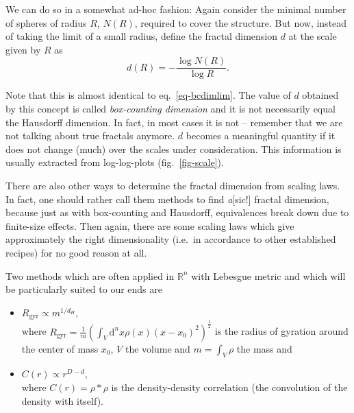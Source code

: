 \documentclass[twocolumn,10pt]{scrartcl}
\begin{document}
            We can do so in a somewhat ad-hoc fashion: Again consider the minimal number of spheres of radius $R$,
            $N(R)$, required to cover the structure. But now, instead of taking the limit of a small radius, define the
            fractal dimension $d$ at the scale given by $R$ as
            \begin{equation}
                d(R)=-\frac{\log N(R)}{\log R}.
                \label{eq-bcdim}
            \end{equation}

            Note that this is almost identical to eq.~\ref{eq-bcdimlim}. 
            The value of $d$ obtained by this concept is called \emph{box-counting dimension} and it is not
            necessarily equal the Hausdorff dimension. In fact, in most cases it is not -- remember that we are not
            talking about true fractals anymore. $d$ becomes a meaningful quantity if it does
            not change (much) over the scales under consideration. This information is usually extracted from
            log-log-plots (fig.~\ref{fig-scale}).

            There are also other ways to determine the fractal dimension from scaling laws. In fact, one should rather
            call them methods to find \emph{a}[sic!] fractal dimension, because just as with box-counting and Hausdorff,
            equivalences break down due to finite-size effects. Then again, there are some scaling laws which give
            approximately the right dimensionality (i.e.\ in accordance to other established recipes) for no good
            reason at all.
            
            Two methods which are often applied in $\mathbb{R}^n$ with Lebesgue metric and which will be particularly
            suited to our ends are
            \begin{itemize}
                \item $R_\mathrm{gyr}\propto m^{1/d_H}$,\\where $R_\mathrm{gyr}=\frac{1}{m}\left(\int_V \mathrm{d}^n x
                    \rho\left(x\right)\left(x-x_0\right)^2\right)^\frac{1}{2}$ is the radius of gyration around the
                    center of mass $x_0$, $V$ the volume and $m=\int_V \rho$ the mass and
                \item $C(r)\propto r^{D-d}$,\\where $C(r)=\rho * \rho$ is the density-density correlation (the
                    convolution of the density with itself).
            \end{itemize}
\end{document}
